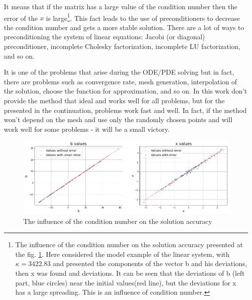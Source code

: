 It means that if the matrix has a large value of the condition number then the error of the $x$ is large\footnote{The influence of the condition number on the solution accuracy presented at the fig. \ref{fig:ill_condition_demo}. Here considered the model example of the linear system, with $\kappa = 3422.83$ and presented the components of the vector b and his deviations, then x was found and deviations. It can be seen that the deviations of b (left part, blue circles) near the initial values(red line), but the deviations for x has a large spreading. This is an influence of condition number.}.
This fact leads to the use of preconditioners to decrease the condition number and gets a more stable solution. There are a lot of ways to preconditioning the system of linear equations: Jacobi (or diagonal) preconditioner, incomplete Cholesky factorization, incomplete LU factorization, and so on. 

It is one of the problems that arise during the ODE/PDE solving but in fact, there are problems such as convergence rate, mesh generation, interpolation of the solution, choose the function for approximation, and so on. In this work don't provide the method that ideal and works well for all problems, but for the presented in the continuation, problems work fast and well. In fact, if the method won't depend on the mesh and use only the randomly chosen points and will work well for some problems - it will be a small victory. 

\begin{figure}[h]
	\centering
	\includegraphics[width=1.0 \textwidth]{images/chapter2/ill_condition_demo.png}
	\caption{The influence of the condition number on the solution accuracy}
	\label{fig:ill_condition_demo}
\end{figure}
